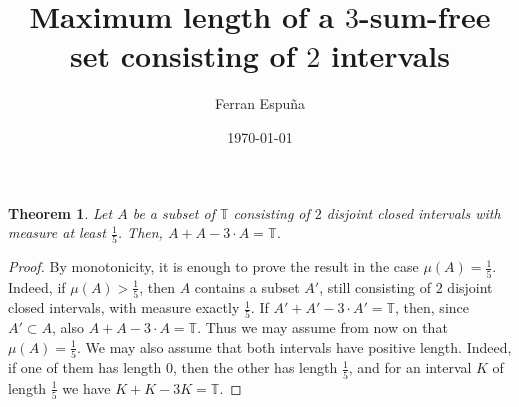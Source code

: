 \documentclass{article}
\title{Maximum length of a $3$-sum-free set consisting of $2$ intervals}
\author{Ferran Espuña}
\date{\today}
\newtheorem{theorem}{Theorem}
\begin{document}
    \maketitle
\fi

    \begin{theorem}\label{thm:2intervals}
        Let $A$ be a subset of $\mathbb{T}$ consisting of $2$ disjoint closed intervals 
        with measure at least $\frac{1}{5}$. Then, $A + A - 3 \cdot A = \mathbb{T}$.
    \end{theorem}

    \begin{proof}
        By monotonicity, it is enough to prove the result in the case $\mu(A)=\frac{1}{5}$.
        Indeed, if $\mu(A)>\frac{1}{5}$, then $A$ contains a subset $A'$, still consisting of $2$ disjoint closed intervals, with measure exactly $\frac{1}{5}$.
        If $A' + A' - 3 \cdot A' = \mathbb{T}$, then, since $A' \subset A$, also $A + A - 3 \cdot A = \mathbb{T}$.
        Thus we may assume from now on that $\mu(A)=\frac{1}{5}$.
        We may also assume that both intervals have positive length.
        Indeed, if one of them has length $0$, then the other has length $\frac{1}{5}$, and for an interval $K$ of length $\frac{1}{5}$ we have $K + K - 3K = \mathbb{T}$.


\end{proof}
\end{document}
